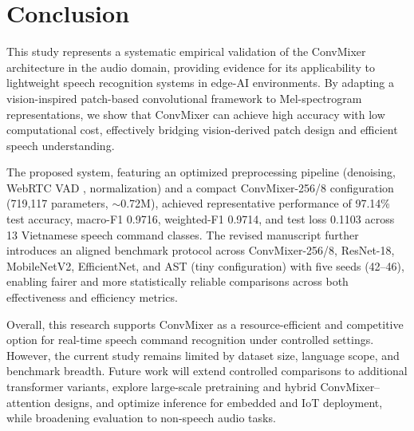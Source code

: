 \section*{Conclusion}

This study represents a systematic empirical validation of the ConvMixer architecture in the audio domain, providing evidence for its applicability to lightweight speech recognition systems in edge-AI environments. By adapting a vision-inspired patch-based convolutional framework to Mel-spectrogram representations, we show that ConvMixer can achieve high accuracy with low computational cost, effectively bridging vision-derived patch design and efficient speech understanding.

The proposed system, featuring an optimized preprocessing pipeline (denoising, WebRTC VAD \cite{WebRTCVAD}, normalization) and a compact ConvMixer-256/8 configuration (719,117 parameters, $\sim$0.72M), achieved representative performance of 97.14\% test accuracy, macro-F1 0.9716, weighted-F1 0.9714, and test loss 0.1103 across 13 Vietnamese speech command classes. The revised manuscript further introduces an aligned benchmark protocol across ConvMixer-256/8, ResNet-18, MobileNetV2, EfficientNet, and AST (tiny configuration) with five seeds (42--46), enabling fairer and more statistically reliable comparisons across both effectiveness and efficiency metrics.

Overall, this research supports ConvMixer as a resource-efficient and competitive option for real-time speech command recognition under controlled settings. However, the current study remains limited by dataset size, language scope, and benchmark breadth. Future work will extend controlled comparisons to additional transformer variants, explore large-scale pretraining and hybrid ConvMixer–attention designs, and optimize inference for embedded and IoT deployment, while broadening evaluation to non-speech audio tasks.

